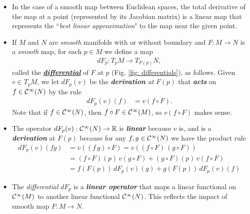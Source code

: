 \documentclass[11pt]{article}
\begin{document}
\begin{itemize}
\item In the case of a smooth map between Euclidean spaces, the total derivative of the map at a point (represented by its Jacobian matrix) is a linear map that represents the ``\emph{best linear approximation}" to the map near the given point.

\item \begin{definition}
If $M$ and $N$ are \emph{smooth} manifolds with or without boundary and $F: M \rightarrow N$ is a \emph{smooth} map, for each $p \in M$ we define a map
\begin{align*}
dF_{p}: T_{p}M \rightarrow T_{F(p)}N ,
\end{align*} called the \underline{\emph{\textbf{differential}}} of $F$ at $p$ (Fig. \ref{fig: differentials}), as follows. Given $v \in T_{p}M$, we let $dF_{p}(v)$ be the \emph{\textbf{derivation} at $F(p)$} that \emph{\textbf{acts}} on $f \in {\mathcal C}^{\infty}(N)$ by the rule 
\begin{align*}
dF_{p}(v)(f) &= v(f \circ F).
\end{align*} Note that if $f \in {\mathcal C}^{\infty}(N)$, then $f \circ F \in {\mathcal C}^{\infty}(M)$, so $v(f \circ F)$ makes sense. 
\end{definition}

\item The operator $dF_{p}(v): {\mathcal C}^{\infty}(N) \rightarrow {\mathbb R}$ is \emph{\textbf{linear}} because $v$ is, and is a \emph{\textbf{derivation}} at $F(p)$ because for any $f, g \in {\mathcal C}^{\infty}(N)$ we have the product rule
\begin{align*}
dF_{p}(v)(fg) &= v((f\,g)\circ F) = v((f\circ F)\,(g \circ F))\\
&= (f\circ F)(p)\,v(g \circ F) + (g \circ F)(p)\,v(f \circ F)\\
&= f(F(p))\,dF_{p}(v)(g) + g(F(p))\,dF_{p}(v)(f)
\end{align*}

\item The \emph{differential} $dF_{p}$ is a \emph{\textbf{linear operator}} that maps a linear functional on ${\mathcal C}^{\infty}(M)$ to another linear functional ${\mathcal C}^{\infty}(N)$. This reflects the impact of smooth map $F: M \rightarrow N$.


\end{itemize}
\end{document}
